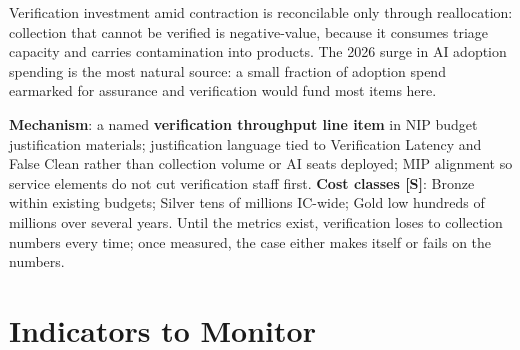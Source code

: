 \documentclass[11pt,letterpaper]{article}
\begin{document}
\begin{keybox}
Verification investment amid contraction is reconcilable only through reallocation: collection that cannot be verified is negative-value, because it consumes triage capacity and carries contamination into products. The 2026 surge in AI adoption spending is the most natural source: a small fraction of adoption spend earmarked for assurance and verification would fund most items here.

\textbf{Mechanism}: a named \textbf{verification throughput line item} in NIP budget justification materials; justification language tied to Verification Latency and False Clean rather than collection volume or AI seats deployed; MIP alignment so service elements do not cut verification staff first. \textbf{Cost classes [S]}: Bronze within existing budgets; Silver tens of millions IC-wide; Gold low hundreds of millions over several years. Until the metrics exist, verification loses to collection numbers every time; once measured, the case either makes itself or fails on the numbers.
\end{keybox}

\section{Indicators to Monitor}
\end{document}
